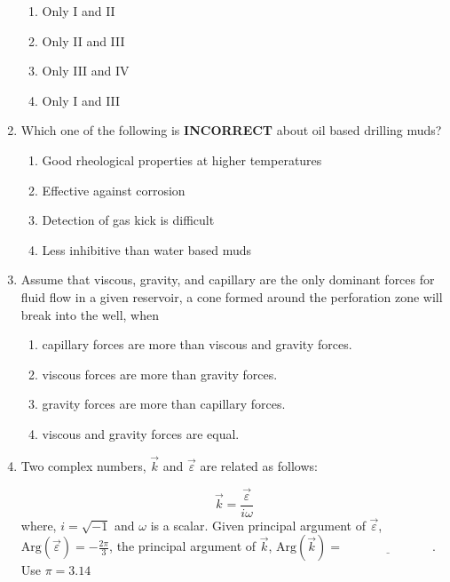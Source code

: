 \documentclass[journal,12pt,onecolumn]{IEEEtran}
\theoremstyle{remark}
\begin{document}
\begin{enumerate}
\begin{enumerate}
\item Only I and II
\item Only II and III
\item Only III and IV
\item Only I and III
\end{enumerate}

\item  Which one of the following is \textbf{INCORRECT} about oil based drilling muds?

\hfill{}

\begin{enumerate}
\item Good rheological properties at higher temperatures 
\item Effective against corrosion
\item Detection of gas kick is difficult
\item Less inhibitive than water based muds
\end{enumerate}

\item Assume that viscous, gravity, and capillary are the only dominant forces for fluid flow in a given reservoir, a cone formed around the perforation zone will break into the well, when

\hfill{}

\begin{enumerate}
\item capillary forces are more than viscous and gravity forces.
\item viscous forces are more than gravity forces.
\item gravity forces are more than capillary forces.
\item viscous and gravity forces are equal.
\end{enumerate}

\pagebreak

\item Two complex numbers, $\vec{k}$ and $\vec{\varepsilon}$ are related as follows:

\hfill{}

\[
\vec{k} = \frac{\vec{\varepsilon}}{i\omega}
\]
where, $i = \sqrt{-1}$ and $\omega$ is a scalar. Given principal argument of $\vec{\varepsilon}$, $\text{Arg}(\vec{\varepsilon}) = -\frac{2\pi}{3}$, the principal argument of $\vec{k}$, $\text{Arg}(\vec{k}) = \underline{\hspace{3cm}}$.  \\
Use $\pi = 3.14$


\end{enumerate}
\end{document}
